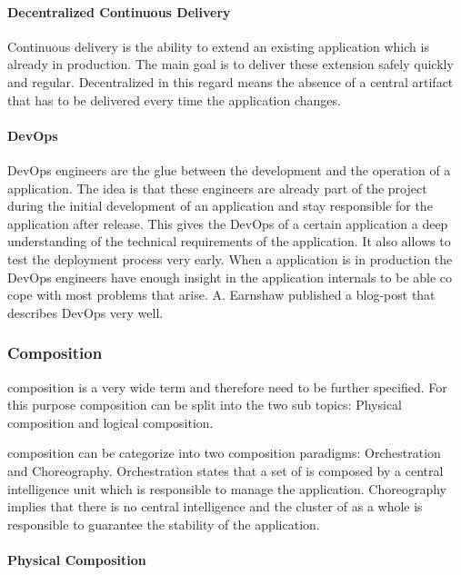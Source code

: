 \paragraph{Decentralized Continuous Delivery}

Continuous delivery is the ability to extend an existing \ms{} application which
is already in production. The main goal is to deliver these extension safely
quickly and regular. Decentralized in this regard means the absence of a central
artifact that has to be delivered every time the application changes.

\paragraph{DevOps}

DevOps engineers are the glue between the development and the operation of a
\ms{} application. The idea is that these engineers are already part of the
project during the initial development of an application and stay responsible
for the application after release. This gives the DevOps of a certain
application a deep understanding of the technical requirements of the
application. It also allows to test the deployment process very early.
When a \ms{} application is in production the DevOps engineers have enough
insight in the application internals to be able co cope with most problems that
arise. A. Earnshaw published a blog-post that describes DevOps very
well\cite{earnshaw2013devops}.

\subsubsection{\ms{} Composition}
\label{subsub:composition}

\ms{} composition is a very wide term and therefore need to be further
specified. For this purpose composition can be split into the two sub topics:
Physical composition and logical composition.

\ms{} composition can be categorize into two composition paradigms:
Orchestration and Choreography. Orchestration states that a set of \mss{} is
composed by a central intelligence unit which is responsible to manage the
application. Choreography implies that there is no central intelligence
and the cluster of \mss{} as a whole is responsible to guarantee the stability
of the application.

\paragraph{Physical Composition}

